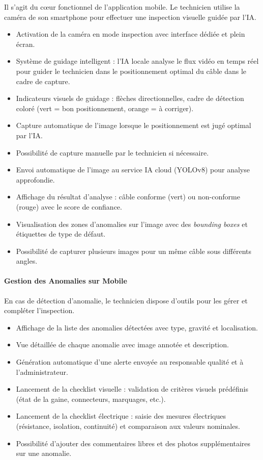 Il s'agit du cœur fonctionnel de l'application mobile. Le technicien utilise la caméra de son smartphone pour effectuer une inspection visuelle guidée par l'IA.

\begin{itemize}
    \item Activation de la caméra en mode inspection avec interface dédiée et plein écran.
    \item Système de guidage intelligent : l'IA locale analyse le flux vidéo en temps réel pour guider le technicien dans le positionnement optimal du câble dans le cadre de capture.
    \item Indicateurs visuels de guidage : flèches directionnelles, cadre de détection coloré (vert = bon positionnement, orange = à corriger).
    \item Capture automatique de l'image lorsque le positionnement est jugé optimal par l'IA.
    \item Possibilité de capture manuelle par le technicien si nécessaire.
    \item Envoi automatique de l'image au service IA cloud (YOLOv8) pour analyse approfondie.
    \item Affichage du résultat d'analyse : câble conforme (vert) ou non-conforme (rouge) avec le score de confiance.
    \item Visualisation des zones d'anomalies sur l'image avec des \textit{bounding boxes} et étiquettes de type de défaut.
    \item Possibilité de capturer plusieurs images pour un même câble sous différents angles.
\end{itemize}

\paragraph{Gestion des Anomalies sur Mobile}

En cas de détection d'anomalie, le technicien dispose d'outils pour les gérer et compléter l'inspection.

\begin{itemize}
    \item Affichage de la liste des anomalies détectées avec type, gravité et localisation.
    \item Vue détaillée de chaque anomalie avec image annotée et description.
    \item Génération automatique d'une alerte envoyée au responsable qualité et à l'administrateur.
    \item Lancement de la checklist visuelle : validation de critères visuels prédéfinis (état de la gaine, connecteurs, marquages, etc.).
    \item Lancement de la checklist électrique : saisie des mesures électriques (résistance, isolation, continuité) et comparaison aux valeurs nominales.
    \item Possibilité d'ajouter des commentaires libres et des photos supplémentaires sur une anomalie.
\end{itemize}

